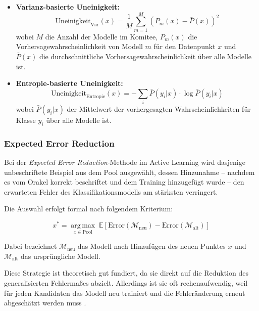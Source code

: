 \documentclass{article}
\DeclareMathOperator*{\argmax}{arg\,max}
\begin{document}
	\begin{itemize}
		\item \textbf{Varianz-basierte Uneinigkeit:}
		\begin{equation}
			\text{Uneinigkeit}_{\text{Var}}(x) = \frac{1}{M} \sum_{m=1}^{M}(P_m(x) - \bar{P}(x))^2
		\end{equation}
		wobei $M$ die Anzahl der Modelle im Komitee, $P_m(x)$ die Vorhersagewahrscheinlichkeit von Modell $m$ für den Datenpunkt $x$ und $\bar{P}(x)$ die durchschnittliche Vorhersagewahrscheinlichkeit über alle Modelle ist.
		
		\item \textbf{Entropie-basierte Uneinigkeit:}
		\begin{equation}
			\text{Uneinigkeit}_{\text{Entropie}}(x) = - \sum_{i} \bar{P}(y_i|x) \cdot \log\bar{P}(y_i|x)
		\end{equation}
		wobei $\bar{P}(y_i|x)$ der Mittelwert der vorhergesagten Wahrscheinlichkeiten für Klasse $y_i$ über alle Modelle ist.
	\end{itemize}
	
	\subsubsection{Expected Error Reduction}
	Bei der \textit{Expected Error Reduction}-Methode im Active Learning wird dasjenige unbeschriftete Beispiel aus dem Pool ausgewählt, dessen Hinzunahme – nachdem es vom Orakel korrekt beschriftet und dem Training hinzugefügt wurde – den erwarteten Fehler des Klassifikationsmodells am stärksten verringert.
	
	Die Auswahl erfolgt formal nach folgendem Kriterium:
	
	\begin{equation}
		x^* = \underset{x \in \mathrm{Pool}}{\argmax} \; \mathbb{E}\left[\mathrm{Error}(\mathcal{M}_{\mathrm{neu}}) - \mathrm{Error}(\mathcal{M}_{\mathrm{alt}})\right]
	\end{equation}
	
	
	
	Dabei bezeichnet $\mathcal{M}_{\text{neu}}$ das Modell nach Hinzufügen des neuen Punktes $x$ und $\mathcal{M}_{\text{alt}}$ das ursprüngliche Modell.
	
	Diese Strategie ist theoretisch gut fundiert, da sie direkt auf die Reduktion des generalisierten Fehlermaßes abzielt. Allerdings ist sie oft rechenaufwendig, weil für jeden Kandidaten das Modell neu trainiert und die Fehleränderung erneut abgeschätzt werden muss \cite{Mussmann2022}.
	
\end{document}

